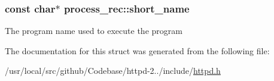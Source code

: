 \subsubsection[{\texorpdfstring{short\+\_\+name}{short_name}}]{\setlength{\rightskip}{0pt plus 5cm}const char$\ast$ process\+\_\+rec\+::short\+\_\+name}\hypertarget{structprocess__rec_a6e3d376827f7d434c676d08c2bf0b995}{}\label{structprocess__rec_a6e3d376827f7d434c676d08c2bf0b995}
The program name used to execute the program 

The documentation for this struct was generated from the following file\+:\begin{DoxyCompactItemize}
\item 
/usr/local/src/github/\+Codebase/httpd-\/2../include/\hyperlink{httpd_8h}{httpd.\+h}\end{DoxyCompactItemize}
